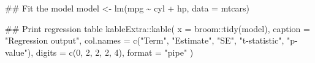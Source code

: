 \documentclass[
  12pt,
  letterpaper,
  DIV=11,
  numbers=noendperiod]{scrartcl}
\newenvironment{Shaded}{}{}
\newcommand{\AttributeTok}[1]{\textcolor[rgb]{0.65,0.15,0.64}{#1}}
\newcommand{\DecValTok}[1]{\textcolor[rgb]{0.60,0.41,0.00}{#1}}
\newcommand{\DocumentationTok}[1]{\textcolor[rgb]{0.89,0.34,0.29}{#1}}
\newcommand{\FunctionTok}[1]{\textcolor[rgb]{0.25,0.47,0.95}{#1}}
\newcommand{\NormalTok}[1]{\textcolor[rgb]{0.22,0.23,0.26}{#1}}
\newcommand{\OtherTok}[1]{\textcolor[rgb]{0.15,0.68,0.38}{#1}}
\newcommand{\SpecialCharTok}[1]{\textcolor[rgb]{0.00,0.52,0.74}{#1}}
\newcommand{\StringTok}[1]{\textcolor[rgb]{0.31,0.63,0.31}{#1}}
\begin{document}
\begin{Shaded}
\begin{Highlighting}[]
\DocumentationTok{\#\# Fit the model}
\NormalTok{model }\OtherTok{\textless{}{-}} \FunctionTok{lm}\NormalTok{(mpg }\SpecialCharTok{\textasciitilde{}}\NormalTok{ cyl }\SpecialCharTok{+}\NormalTok{ hp, }\AttributeTok{data =}\NormalTok{ mtcars)}

\DocumentationTok{\#\# Print regression table}
\NormalTok{kableExtra}\SpecialCharTok{::}\FunctionTok{kable}\NormalTok{(}
  \AttributeTok{x =}\NormalTok{ broom}\SpecialCharTok{::}\FunctionTok{tidy}\NormalTok{(model), }
  \AttributeTok{caption =} \StringTok{"Regression output"}\NormalTok{,}
  \AttributeTok{col.names =} \FunctionTok{c}\NormalTok{(}\StringTok{"Term"}\NormalTok{, }\StringTok{"Estimate"}\NormalTok{, }\StringTok{"SE"}\NormalTok{, }\StringTok{"t{-}statistic"}\NormalTok{, }\StringTok{"p{-}value"}\NormalTok{),}
  \AttributeTok{digits =} \FunctionTok{c}\NormalTok{(}\DecValTok{0}\NormalTok{, }\DecValTok{2}\NormalTok{, }\DecValTok{2}\NormalTok{, }\DecValTok{2}\NormalTok{, }\DecValTok{4}\NormalTok{),}
  \AttributeTok{format =} \StringTok{"pipe"}
\NormalTok{)}
\end{Highlighting}
\end{Shaded}
\end{document}
